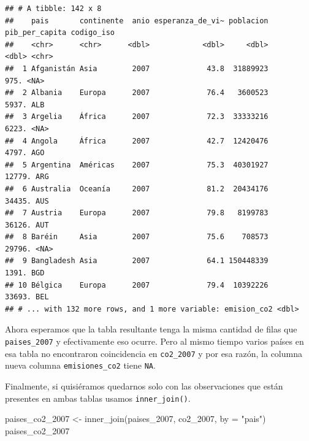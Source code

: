 \documentclass[
  openany]{book}
\newenvironment{Shaded}{\begin{snugshade}}{\end{snugshade}}
\newcommand{\AttributeTok}[1]{\textcolor[rgb]{0.77,0.63,0.00}{#1}}
\newcommand{\FunctionTok}[1]{\textcolor[rgb]{0.00,0.00,0.00}{#1}}
\newcommand{\NormalTok}[1]{#1}
\newcommand{\OtherTok}[1]{\textcolor[rgb]{0.56,0.35,0.01}{#1}}
\newcommand{\StringTok}[1]{\textcolor[rgb]{0.31,0.60,0.02}{#1}}
\begin{document}
\begin{verbatim}
## # A tibble: 142 x 8
##    pais       continente  anio esperanza_de_vi~ poblacion pib_per_capita codigo_iso
##    <chr>      <chr>      <dbl>            <dbl>     <dbl>          <dbl> <chr>     
##  1 Afganistán Asia        2007             43.8  31889923           975. <NA>      
##  2 Albania    Europa      2007             76.4   3600523          5937. ALB       
##  3 Argelia    África      2007             72.3  33333216          6223. <NA>      
##  4 Angola     África      2007             42.7  12420476          4797. AGO       
##  5 Argentina  Américas    2007             75.3  40301927         12779. ARG       
##  6 Australia  Oceanía     2007             81.2  20434176         34435. AUS       
##  7 Austria    Europa      2007             79.8   8199783         36126. AUT       
##  8 Baréin     Asia        2007             75.6    708573         29796. <NA>      
##  9 Bangladesh Asia        2007             64.1 150448339          1391. BGD       
## 10 Bélgica    Europa      2007             79.4  10392226         33693. BEL       
## # ... with 132 more rows, and 1 more variable: emision_co2 <dbl>
\end{verbatim}

Ahora esperamos que la tabla resultante tenga la misma cantidad de filas que \texttt{paises\_2007} y efectivamente eso ocurre.
Pero al mismo tiempo varios países en esa tabla no encontraron coincidencia en \texttt{co2\_2007} y por esa razón, la columna nueva columna \texttt{emisiones\_co2} tiene \texttt{NA}.

Finalmente, si quisiéramos quedarnos solo con las observaciones que están presentes en ambas tablas usamos \texttt{inner\_join()}.

\begin{Shaded}
\begin{Highlighting}[]
\NormalTok{paises\_co2\_2007 }\OtherTok{\textless{}{-}} \FunctionTok{inner\_join}\NormalTok{(paises\_2007, co2\_2007, }\AttributeTok{by =} \StringTok{"pais"}\NormalTok{)}
\NormalTok{paises\_co2\_2007}
\end{Highlighting}
\end{Shaded}
\end{document}
